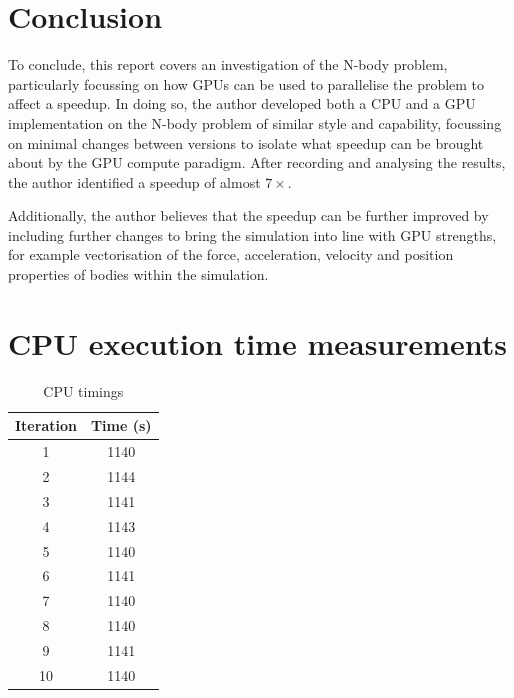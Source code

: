 \documentclass[journal,transmag]{IEEEtran}
\begin{document}
    \section{Conclusion}
    To conclude, this report covers an investigation of the N-body problem, particularly focussing on how GPUs can be
    used to parallelise the problem to affect a speedup. In doing so, the author developed both a CPU and a GPU
    implementation on the N-body problem of similar style and capability, focussing on minimal changes between versions
    to isolate what speedup can be brought about by the GPU compute paradigm. After recording and analysing the results,
    the author identified a speedup of almost $ 7\times $.

    Additionally, the author believes that the speedup can be further improved by including further changes to bring the
    simulation into line with GPU strengths, for example vectorisation of the force, acceleration, velocity and position
    properties of bodies within the simulation.


    \appendices
    \section{CPU execution time measurements}
    \begin{table}[h]
        \centering
        \caption{CPU timings}
        \label{CPUTableRaw}
        \begin{tabular}{ c c }
            Iteration & Time (s) \\
            \hline
            \hline
            1         & 1140 \\
            2         & 1144 \\
            3         & 1141 \\
            4         & 1143 \\
            5         & 1140 \\
            6         & 1141 \\
            7         & 1140 \\
            8         & 1140 \\
            9         & 1141 \\
            10        & 1140 \\
        \end{tabular}
    \end{table}
\end{document}
